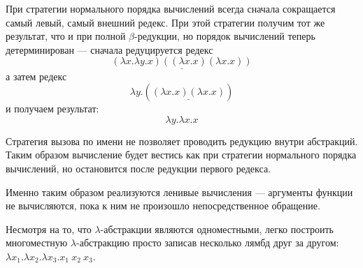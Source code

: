 \begin{definition}
    При стратегии нормального порядка вычислений всегда сначала сокращается самый левый, самый внешний редекс. При этой стратегии получим тот же результат, что и при полной $\beta$-редукции, но порядок вычислений теперь детерминирован --- сначала редуцируется редекс
    \begin{equation*}
        \underline{(\lambda x. \lambda y. x)((\lambda x.x)(\lambda x.x))}
    \end{equation*}
    а затем редекс
    \begin{equation*}
        \lambda y.(\underline{(\lambda x.x)(\lambda x.x)})
    \end{equation*}
    и получаем результат:
    \begin{equation*}
        \lambda y.\lambda x.x
    \end{equation*}
\end{definition}

\begin{definition}
    Стратегия вызова по имени не позволяет проводить редукцию внутри абстракций. Таким образом вычисление будет вестись как при стратегии нормального порядка вычислений, но остановится после редукции первого редекса.

    Именно таким образом реализуются ленивые вычисления --- аргументы функции не вычисляются, пока к ним не произошло непосредственное обращение.
\end{definition}

\begin{remark}
    Несмотря на то, что $\lambda$-абстракции являются одноместными, легко построить многоместную $\lambda$-абстракцию просто записав несколько лямбд друг за другом: $\lambda x_1. \lambda x_2. \lambda x_3. x_1\ x_2\ x_3$.
\end{remark}
